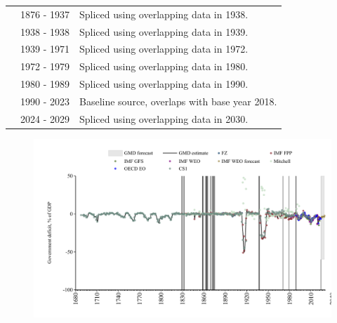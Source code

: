 \documentclass[12pt,a4paper,landscape]{article}
\begin{document}
\begin{adjustbox}{max totalsize={\paperwidth}{\paperheight},center}
\begin{minipage}[t][\textheight][t]{\textwidth}
\begin{table}[H]
\begin{tabular}{|l|l|l|}
\rowcolor{lightgray}\cite{IMF_FPP}& 1876 - 1937 &Spliced using overlapping data in 1938. \\
\rowcolor{white}\cite{CS1_GBR}& 1938 - 1938 &Spliced using overlapping data in 1939. \\
\rowcolor{lightgray}\cite{IMF_FPP}& 1939 - 1971 &Spliced using overlapping data in 1972. \\
\rowcolor{white}\cite{IMF_GFS}& 1972 - 1979 &Spliced using overlapping data in 1980. \\
\rowcolor{lightgray}\cite{IMF_WEO}& 1980 - 1989 &Spliced using overlapping data in 1990. \\
\rowcolor{white}\cite{OECD_EO}& 1990 - 2023 &Baseline source, overlaps with base year 2018. \\
\rowcolor{lightgray}\cite{IMF_WEO_forecast}& 2024 - 2029 &Spliced using overlapping data in 2030. \\
\hline
\end{tabular}
\end{table}
\begin{figure}[H]
\centering
\includegraphics[width=\textwidth,height=0.6\textheight,keepaspectratio]{graphs/GBR_govdef_GDP.pdf}
\end{figure}
\end{minipage}
\end{adjustbox}
\end{document}
